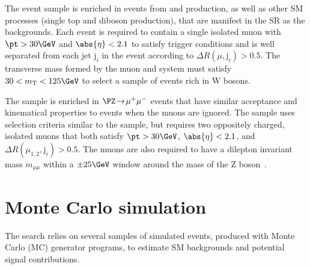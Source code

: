 The \mj event sample is enriched in events from \wmj and \ttbar
production, as well as other SM processes (\eg single top and diboson
production), that are manifest in the SR as the \lost
backgrounds. Each event is required to contain a single isolated muon
with $\pt > 30\GeV$ and $\abs{\eta} < 2.1$ to satisfy trigger
conditions and is well separated from each jet $\text{j}_i$ in the
event according to ${\Delta}R(\mu,\text{j}_i) > 0.5$. The transverse
mass formed by the muon \pt and \ptvecmiss system must satisfy $30 <
m_\text{T} < 125\GeV$ to select a sample of events rich in W bosons. 

The \mmj sample is enriched in $\PZ\! \rightarrow\!  \mu^+\mu^-$
events that have similar acceptance and kinematical properties to
\znunuj events when the muons are ignored. The sample uses selection
criteria similar to the \mj sample, but requires two oppositely
charged, isolated muons that both satisfy $\pt > 30\GeV$, $\abs{\eta}
< 2.1$, and ${\Delta}R(\mu_{1,2},\text{j}_i) > 0.5$. The muons are
also required to have a dilepton invariant mass $m_{\mu\mu}$ within a
${\pm}25\GeV$ window around the mass of the Z
boson~\cite{1674-1137-38-9-090001}.


\section{Monte Carlo simulation}
\label{sec:simulation}

The search relies on several samples of simulated events, produced
with Monte Carlo (MC) generator programs, to estimate SM backgrounds
and potential signal contributions.

